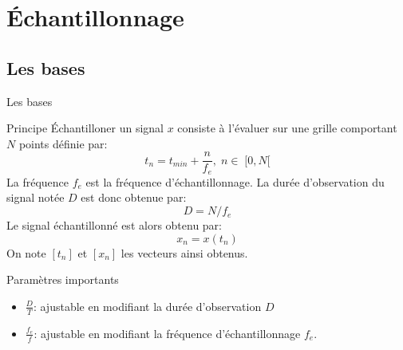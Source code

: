\documentclass[8pt,a4paper]{beamer}
\begin{document}
%  
%  

\section{Échantillonnage}
  \subsection{Les bases}
  \begin{frame}{Les bases}
  \begin{block}{Principe}
  \'Echantilloner un signal $x$ consiste à l'évaluer sur une grille comportant $N$ points définie par:
  $$
  t_n = t_{min}+\frac{n}{f_e}, \; n \in \; [0,N[
  $$
  La fréquence $f_e$ est la fréquence d’échantillonnage. La durée d'observation du signal notée $D$ est donc obtenue par:
  $$
  D = N/f_e
  $$
  Le signal échantillonné est alors obtenu par:
  $$
  x_n=x(t_n)
  $$
  On note $[t_n]$ et $[x_n]$ les vecteurs ainsi obtenus.
  \end{block}
  \begin{block}{Paramètres importants}  
  \begin{itemize}
  \item $\frac{D}{T}$: ajustable en modifiant la durée d'observation $D$
  \item $\frac{f_e}{f}$: ajustable en modifiant la fréquence d’échantillonnage $f_e$.
  \end{itemize}
  \end{block}
  \end{frame}
  
\end{document}
